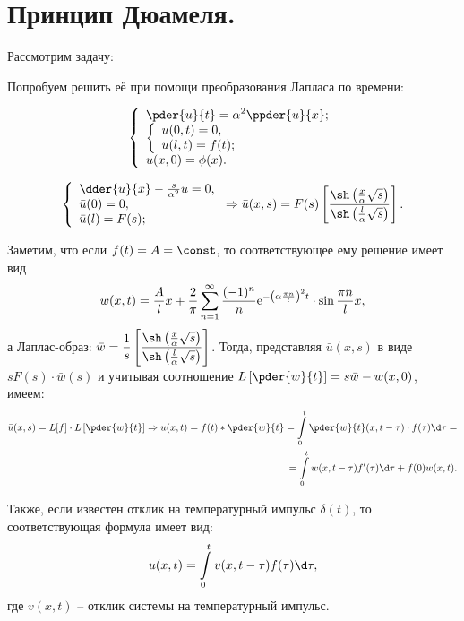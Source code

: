 \chapter{Принцип Дюамеля.}

\begin{minipage}{.55\textwidth}
    Рассмотрим задачу:

    Попробуем решить её при помощи преобразования Лапласа по времени:
\end{minipage}
\hfill
\begin{minipage}{.4\textwidth}
    \[
        \left\{ \begin{array}{l}
            \ds \pder{u}{t} = \alpha^2 \ppder{u}{x}; \\
                \left\{ \begin{array}{l}
                    u(0, t) = 0, \\
                    u(l, t) = f(t); 
                \end{array} \right. \\
            u(x, 0) = \phi(x).
        \end{array} \right.
    \]
\end{minipage}

\[
    \left\{ \begin{array}{l}
        \dder{\bar{u}}{x} - \frac{s}{\alpha^2}\bar{u} = 0, \\
        \bar{u}(0) = 0, \\
        \bar{u}(l) = F(s);
    \end{array} \right.
    \Rightarrow
    \bar{u}(x, s) = F(s)\left[\frac{\sh\left(\frac{x}{\alpha}\sqrt{s}\right)}
    {\sh\left(\frac{l}{\alpha}\sqrt{s}\right)}\right].
\]

Заметим, что если \( f(t) = A = \const \), то соответствующее ему решение имеет
вид
\[
    w(x, t) = \frac{A}{l}x + \frac{2}{\pi}\sum\limits_{n=1}^\infty
    \frac{(-1)^n}{n}\mathrm{e}^{-\left(\alpha\frac{\pi n}{l}\right)^2t}\cdot
    \sin\frac{\pi n}{l}x,
\]
а Лаплас-образ: \( \ds \bar{w} = \frac{1}{s}\left[\frac{\sh\left(
\frac{x}{\alpha}\sqrt{s}\right)}{\sh\left(\frac{l}{\alpha}\sqrt{s}\right)}
\right] \).
Тогда, представляя \( \bar{u}(x, s) \) в виде \( sF(s)\cdot\bar{w}(s) \) и
учитывая соотношение \( \ds L\left[\pder{w}{t}\right] = s\bar{w} - w(x, 0) \),
имеем:
\begin{align*}
    \bar{u}(x, s) = L[f]\cdot L\left[\pder{w}{t}\right] \Rightarrow
    u(x, t) = f(t)*\pder{w}{t} = \int\limits_0^t \pder{w}{t}(x, t-\tau)\cdot
    f(\tau)\d\tau = \\
    = \int\limits_0^t w(x, t - \tau)f'(\tau)\d\tau + f(0)w(x, t).
\end{align*}

Также, если известен отклик на температурный импульс \( \delta(t) \), то
соответствующая формула имеет вид:
\[
    u(x, t) = \int\limits_0^t v(x, t - \tau)f(\tau)\d\tau,
\]
где \( v(x, t) \) -- отклик системы на температурный импульс.

\newpage
